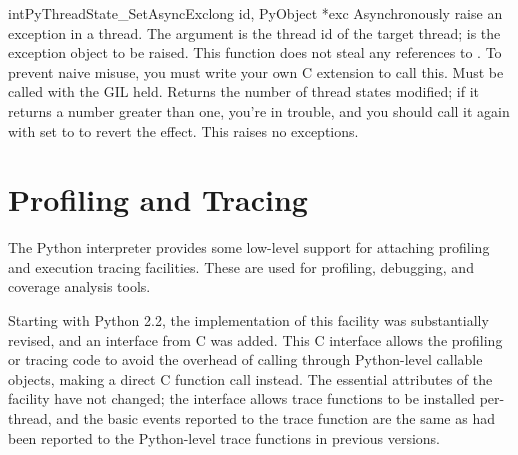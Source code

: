 \begin{cfuncdesc}{int}{PyThreadState_SetAsyncExc}{long id, PyObject *exc}
  Asynchronously raise an exception in a thread. 
  The  argument is the thread id of the target thread;
   is the exception object to be raised.
  This function does not steal any references to .
  To prevent naive misuse, you must write your own C extension 
  to call this.  Must be called with the GIL held. 
  Returns the number of thread states modified; if it returns a number 
  greater than one, you're in trouble, and you should call it again 
  with  set to  to revert the effect.
  This raises no exceptions.
\end{cfuncdesc}


\section{Profiling and Tracing \label{profiling}}


The Python interpreter provides some low-level support for attaching
profiling and execution tracing facilities.  These are used for
profiling, debugging, and coverage analysis tools.

Starting with Python 2.2, the implementation of this facility was
substantially revised, and an interface from C was added.  This C
interface allows the profiling or tracing code to avoid the overhead
of calling through Python-level callable objects, making a direct C
function call instead.  The essential attributes of the facility have
not changed; the interface allows trace functions to be installed
per-thread, and the basic events reported to the trace function are
the same as had been reported to the Python-level trace functions in
previous versions.

